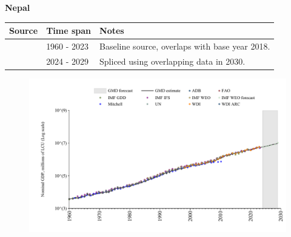 \documentclass[12pt,a4paper,landscape]{article}
\begin{document}
\begin{adjustbox}{max totalsize={\paperwidth}{\paperheight},center}
\begin{minipage}[t][\textheight][t]{\textwidth}
\vspace*{0.5cm}
{}
\begin{center}
{\Large\bfseries Nepal}
\end{center}
\vspace{0.5cm}
\begin{table}[H]
\centering
\small
\begin{tabular}{|l|l|l|}
\hline
\textbf{Source} & \textbf{Time span} & \textbf{Notes} \\
\hline
\rowcolor{white}\cite{WDI}& 1960 - 2023 &Baseline source, overlaps with base year 2018.\\
\rowcolor{lightgray}\cite{IMF_WEO_forecast}& 2024 - 2029 &Spliced using overlapping data in 2030.\\
\hline
\end{tabular}
\end{table}
\begin{figure}[H]
\centering
\includegraphics[width=\textwidth,height=0.6\textheight,keepaspectratio]{graphs/NPL_nGDP.pdf}
\end{figure}
\end{minipage}
\end{adjustbox}
\end{document}
